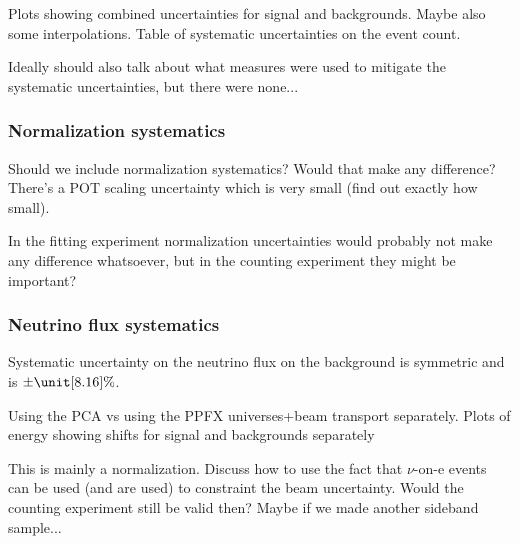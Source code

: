 Plots showing combined uncertainties for signal and backgrounds. Maybe also some interpolations. Table of systematic uncertainties on the event count.

Ideally should also talk about what measures were used to mitigate the systematic uncertainties, but there were none...

\subsubsection*{Normalization systematics}
Should we include normalization systematics? Would that make any difference? There's a POT scaling uncertainty which is very small (find out exactly how small).

In the fitting experiment normalization uncertainties would probably not make any difference whatsoever, but in the counting experiment they might be important?

\subsubsection*{Neutrino flux systematics}

Systematic uncertainty on the neutrino flux on the background is symmetric and is $\pm\unit[8.16]{\%}$.

Using the PCA vs using the PPFX universes+beam transport separately. Plots of energy showing shifts for signal and backgrounds separately


This is mainly a normalization. Discuss how to use the fact that $\nu$-on-e events can be used (and are used) to constraint the beam uncertainty. Would the counting experiment still be valid then? Maybe if we made another sideband sample...

